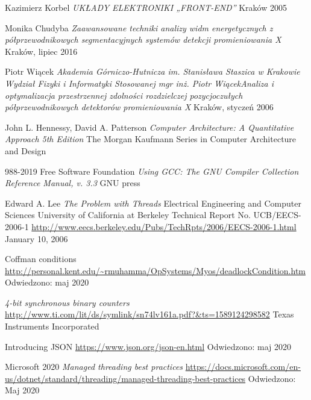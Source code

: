 \begin{thebibliography}{99}
        Kazimierz Korbel \textit{UKŁADY ELEKTRONIKI „FRONT-END”}
        Kraków 2005

        Monika Chudyba
        \textit{
        Zaawansowane techniki analizy widm energetycznych z półprzewodnikowych segmentacyjnych systemów detekcji promieniowania X }
        Kraków, lipiec 2016

        Piotr Wiącek
        \textit{Akademia Górniczo-Hutnicza im. Stanisława Staszica w Krakowie Wydział Fizyki i Informatyki Stosowanej mgr inż. Piotr WiącekAnaliza i optymalizacja przestrzennej zdolności rozdzielczej pozycjoczułych półprzewodnikowych detektorów promieniowania X}
        Kraków, styczeń 2006

        John L. Hennessy, David A. Patterson 
        \textit{Computer Architecture: A Quantitative Approach  5th Edition }
        The Morgan Kaufmann Series in Computer Architecture and Design

        988-2019 Free Software Foundation
        \textit{Using GCC: The GNU Compiler Collection Reference Manual, v. 3.3}
        GNU press

        Edward A. Lee
        \textit{The Problem with Threads}
        Electrical Engineering and Computer Sciences
        University of California at Berkeley
        Technical Report No. UCB/EECS-2006-1
        \url{http://www.eecs.berkeley.edu/Pubs/TechRpts/2006/EECS-2006-1.html}
        January 10, 2006

        Coffman conditions
        \url{http://personal.kent.edu/~rmuhamma/OpSystems/Myos/deadlockCondition.htm}
        Odwiedzono: maj 2020

        \textit{4-bit synchronous binary counters}
        \url{http://www.ti.com/lit/ds/symlink/sn74lv161a.pdf?&ts=1589124298582}
        Texas Instruments Incorporated
        

        Introducing JSON
        \url{https://www.json.org/json-en.html}
        Odwiedzono: maj 2020

        Microsoft 2020
        \textit{Managed threading best practices}
        \url{https://docs.microsoft.com/en-us/dotnet/standard/threading/managed-threading-best-practices}
        Odwiedzono: Maj 2020
        

\end{thebibliography}
